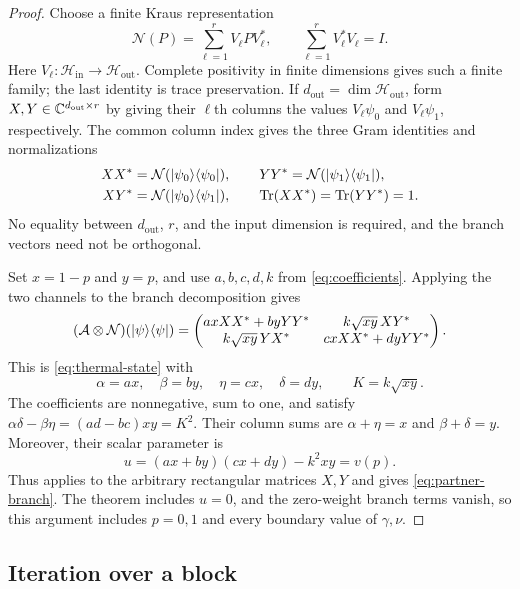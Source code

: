 \begin{proof}
Choose a finite Kraus representation
\[
 \mathcal N(P)=\sum_{\ell=1}^r V_\ell P V_\ell^*,
 \qquad \sum_{\ell=1}^r V_\ell^*V_\ell=I.
\]
Here $V_\ell:\mathcal H_{\mathrm{in}}\to\mathcal H_{\mathrm{out}}$.
Complete positivity in finite dimensions gives such a finite family;
the last identity is trace preservation. If
$d_{\mathrm{out}}=\dim\mathcal H_{\mathrm{out}}$, form
$X,Y\in\mathbb C^{d_{\mathrm{out}}\times r}$ by giving their $\ell$th columns
the values $V_\ell\psi_0$ and $V_\ell\psi_1$, respectively. The common
column index gives the three Gram identities and normalizations
\begin{equation}\label{eq:partner-grams}
 \begin{split}
 XX^*&=\mathcal N(\lvert \psi_0\rangle\langle \psi_0\rvert),\qquad
 YY^*=\mathcal N(\lvert \psi_1\rangle\langle \psi_1\rvert),\\
 XY^*&=\mathcal N(\lvert \psi_0\rangle\langle \psi_1\rvert),\qquad
 \operatorname{Tr}(XX^*)=\operatorname{Tr}(YY^*)=1.
 \end{split}
\end{equation}
No equality between $d_{\mathrm{out}}$, $r$, and the input dimension
is required, and the branch vectors need not be orthogonal.

Set $x=1-p$ and $y=p$, and use $a,b,c,d,k$ from
\eqref{eq:coefficients}. Applying the two channels to the branch
decomposition gives
\[
 (\mathcal A\otimes\mathcal N)(\lvert \psi\rangle\langle \psi\rvert)=
 \begin{pmatrix}
 axXX^*+byYY^*&k\sqrt{xy}\,XY^*\\
 k\sqrt{xy}\,YX^*&cxXX^*+dyYY^*
 \end{pmatrix}.
\]
This is \eqref{eq:thermal-state} with
\begin{equation}\label{eq:channel-substitution}
 \alpha=ax,\quad\beta=by,\quad\eta=cx,\quad\delta=dy,
 \qquad K=k\sqrt{xy}.
\end{equation}
The coefficients are nonnegative, sum to one, and satisfy
$\alpha\delta-\beta\eta=(ad-bc)xy=K^2$.
Their column sums are $\alpha+\eta=x$ and $\beta+\delta=y$.
Moreover, their scalar parameter is
\[
 u=(ax+by)(cx+dy)-k^2xy=v(p).
\]
Thus  applies to the arbitrary rectangular matrices
$X,Y$ and gives \eqref{eq:partner-branch}. The theorem includes $u=0$,
and the zero-weight branch terms vanish, so this argument includes
$p=0,1$ and every boundary value of $\gamma,\nu$.
\end{proof}

\subsection{Iteration over a block}


